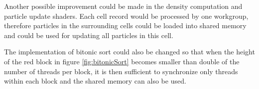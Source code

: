 \documentclass[a4paper,report]{IEEEtran}
\begin{document}
Another possible improvement could be made in the density computation and particle update shaders. Each cell record would be processed by one workgroup, therefore particles in the surrounding cells could be loaded into shared memory and could be used for updating all particles in this cell.

The implementation of bitonic sort could also be changed so that when the height of the red block in figure \ref{fig:bitonicSort} becomes smaller than double of the number of threads per block, it is then sufficient to synchronize only threads within each block and the shared memory can also be used.

%
%



%
%
\end{document}

